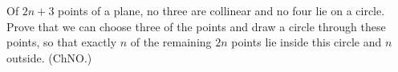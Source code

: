 Of $2n + 3$ points of a plane, no three are collinear and no four lie on a circle. Prove that we can choose three of the points and draw a circle through these points, so that exactly $n$ of the remaining $2n$ points lie inside this circle and $n$ outside. (ChNO.)
